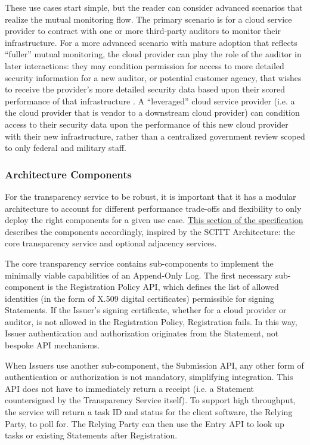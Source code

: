 \documentclass{jdf}
\begin{document}
These use cases start simple, but the reader can consider advanced scenarios that realize the mutual monitoring flow. The primary scenario is for a cloud service provider to contract with one or more third-party auditors to monitor their infrastructure. For a more advanced scenario with mature adoption that reflects ``fuller'' mutual monitoring, the cloud provider can play the role of the auditor in later interactions: they may condition permission for access to more detailed security information for a new auditor, or potential customer agency, that wishes to receive the provider's more detailed security data based upon their scored performance of that infrastructure . A ``leveraged'' cloud service provider (i.e. a the cloud provider that is vendor to a downstream cloud provider) can condition access to their security data upon the performance of this new cloud provider with their new infrastructure, rather than a centralized government review scoped to only federal and military staff.

\subsubsection{Architecture Components}

For the transparency service to be robust, it is important that it has a modular architecture to account for different performance trade-offs and flexibility to only deploy the right components for a given use case. \href{https://aj-stein.github.io/conmotion/architecture.html#components}{This section of the specification} describes the components accordingly, inspired by the SCITT Architecture: the core transparency service and optional adjacency services.

The core transparency service contains sub-components to implement the minimally viable capabilities of an Append-Only Log. The first necessary sub-component is the Registration Policy API, which defines the list of allowed identities (in the form of X.509 digital certificates) permissible for signing Statements. If the Issuer's signing certificate, whether for a cloud provider or auditor, is not allowed in the Registration Policy, Registration fails. In this way, Issuer authentication and authorization originates from the Statement, not bespoke API mechanisms.

When Issuers use another sub-component, the Submission API, any other form of authentication or authorization is not mandatory, simplifying integration. This API does not have to immediately return a receipt (i.e. a Statement countersigned by the Transparency Service itself). To support high throughput, the service will return a task ID and status for the client software, the Relying Party, to poll for. The Relying Party can then use the Entry API to look up tasks or existing Statements after Registration. 
\end{document}
